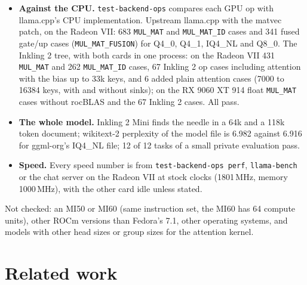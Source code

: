 \documentclass[11pt,a4paper]{article}
\newcommand{\code}[1]{\texttt{#1}}
\begin{document}
\begin{itemize}
\item \textbf{Against the CPU.} \code{test-backend-ops} compares each GPU op with llama.cpp's CPU implementation.
Upstream llama.cpp with the matvec patch, on the Radeon VII: 683 \code{MUL\_MAT} and \code{MUL\_MAT\_ID} cases and 341
fused gate/up cases (\code{MUL\_MAT\_FUSION}) for Q4\_0, Q4\_1, IQ4\_NL and Q8\_0. The Inkling 2 tree, with both
cards in one process: on the Radeon VII 431 \code{MUL\_MAT} and 262 \code{MUL\_MAT\_ID} cases, 67 Inkling 2 op cases
including attention with the bias up to 33k keys, and 6 added plain attention cases (7000 to 16384 keys, with and
without sinks); on the RX 9060 XT 914 float \code{MUL\_MAT} cases without rocBLAS and the 67 Inkling 2 cases. All pass.
\item \textbf{The whole model.} Inkling 2 Mini finds the needle in a 64k and a 118k token document; wikitext-2
perplexity of the model file is 6.982 against 6.916 for ggml-org's IQ4\_NL file; 12 of 12 tasks of a small private
evaluation pass.
\item \textbf{Speed.} Every speed number is from \code{test-backend-ops perf}, \code{llama-bench} or the chat server on
the Radeon VII at stock clocks (1801\,MHz, memory 1000\,MHz), with the other card idle unless stated.
\end{itemize}
Not checked: an MI50 or MI60 (same instruction set, the MI60 has 64 compute units), other ROCm versions than Fedora's
7.1, other operating systems, and models with other head sizes or group sizes for the attention kernel.

\section{Related work}
\label{sec:related}
\end{document}
